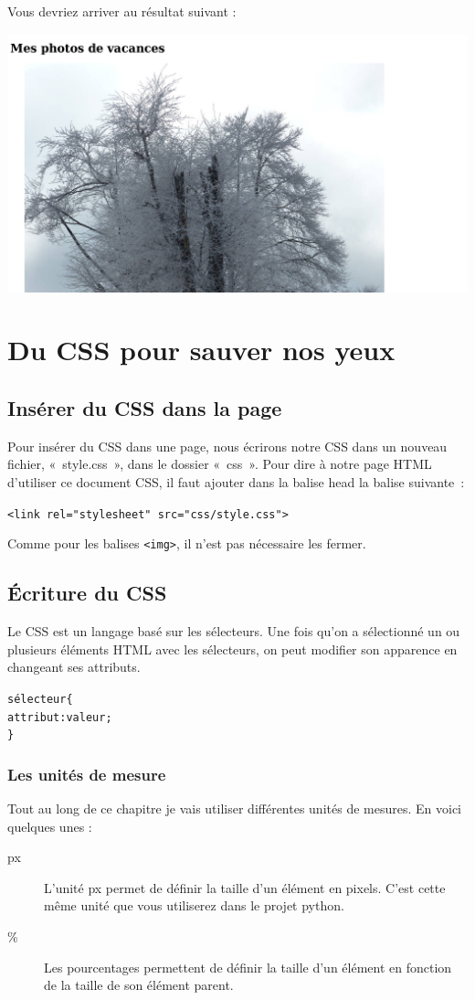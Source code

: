 Vous devriez arriver au résultat suivant :
\begin{center}\includegraphics[width=.8\linewidth]{img/screenshot_html.png}\end{center}

\section{Du CSS pour sauver nos yeux}
\subsection{Insérer du CSS dans la page}
Pour insérer du CSS dans une page, nous écrirons notre CSS dans un nouveau
fichier, « style.css », dans le dossier « css ».
Pour dire à notre page HTML d’utiliser ce document CSS, il faut ajouter dans la
balise head la balise suivante :

\texttt{<link rel="stylesheet" src="css/style.css">}

Comme pour les balises \texttt{<img>}, il n'est pas nécessaire les
fermer.
\subsection{Écriture du CSS}
Le CSS est un langage basé sur les sélecteurs. Une fois qu’on a sélectionné un
ou plusieurs éléments HTML avec les sélecteurs, on peut modifier son apparence
en changeant ses attributs.
\begin{alltt}
\colorbox{blue!30}{sélecteur} \{
        \colorbox{green!30}{attribut}: \colorbox{red!30}{valeur};
\}
\end{alltt}

\subsubsection{Les unités de mesure}
Tout au long de ce chapitre je vais utiliser différentes unités de mesures. En
voici quelques unes :
\begin{description}
	\item[px] L'unité px permet de définir la taille d'un élément en pixels.
	C'est cette même unité que vous utiliserez dans le projet python.
	\item[\%] Les pourcentages permettent de définir la taille d'un élément
	en fonction de la taille de son élément parent.
\end{description}
